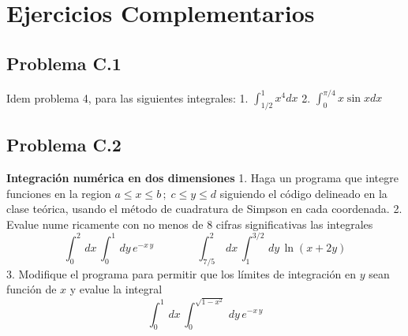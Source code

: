 \documentclass[11pt]{article}
\begin{document}
    \hypertarget{ejercicios-complementarios}{%
\section*{Ejercicios Complementarios}\label{ejercicios-complementarios}}

    \hypertarget{problema-c.1}{%
\subsection*{Problema C.1}\label{problema-c.1}}

Idem problema 4, para las siguientes integrales: 1.
\(\int_{1/2}^1 x^4 dx\) 2. \(\int_0^{\pi/4} x \sin x dx\)

    \hypertarget{problema-c.2}{%
\subsection*{Problema C.2}\label{problema-c.2}}

\textbf{Integración numérica en dos dimensiones} 1. Haga un programa que
integre funciones en la region \(a\le x \le b\,;\;c \le y \le d\)
siguiendo el código delineado en la clase teórica, usando el método de
cuadratura de Simpson en cada coordenada. 2. Evalue nume ricamente con
no menos de 8 cifras significativas las integrales \[
\int_0^2\,dx\, \int_0^1\,dy\, e^{-x\,y} \;\;\;\;\;\;\;\;\;\;\;\;\;\;
\int_{7/5}^2\,dx\, \int_1^{3/2}\,dy\, \ln{(x+2 y)}
\] 3. Modifique el programa para permitir que los límites de integración
en \(y\) sean función de \(x\) y evalue la integral \[
\int_0^1\,dx\, \int_0^{\sqrt{1-x^2}}\,dy\, e^{-x\,y} 
\]


    
    
    
    
\end{document}
